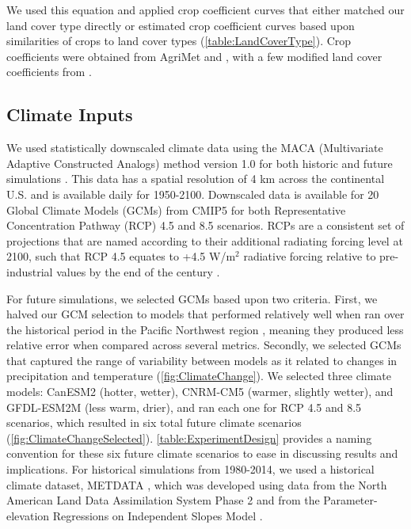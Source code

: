 \documentclass[water,article,submit,moreauthors,pdftex,10pt,a4paper]{mdpi}
\theoremstyle{mdpi}
\newcounter{re}
\theoremstyle{mdpidefinition}
\begin{document}
We used this equation and applied crop coefficient curves that either matched our land cover type directly or estimated crop coefficient curves based upon similarities of crops to land cover types (\cref{table:LandCoverType}). Crop coefficients were obtained from AgriMet and \citep{Allen:2007ta}, with a few modified land cover coefficients from \citep{Inouye:2014ws}.  

\subsection{Climate Inputs}

We used statistically downscaled climate data using the MACA (Multivariate Adaptive Constructed Analogs) method version 1.0 for both historic and future simulations \citep{Abatzoglou:2011kca}. This data has a spatial resolution of 4 km across the continental U.S. and is available daily for 1950-2100. Downscaled data is available for 20 Global Climate Models (GCMs) from CMIP5 for both Representative Concentration Pathway (RCP) 4.5 and 8.5 scenarios. RCPs are a consistent set of projections that are named according to their additional radiating forcing level at 2100, such that RCP 4.5 equates to +4.5 W/m${}^2$ radiative forcing relative to pre-industrial values by the end of the century \citep{vanVuuren:2011tu}. 

For future simulations, we selected GCMs based upon two criteria. First, we halved our GCM selection to models that performed relatively well when ran over the historical period in the Pacific Northwest region \citep{Rupp:2013ea}, meaning they produced less relative error when compared across several metrics. Secondly, we selected GCMs that captured the range of variability between models as it related to changes in precipitation and temperature (\cref{fig:ClimateChange}). We selected three climate models: CanESM2 (hotter, wetter), CNRM-CM5 (warmer, slightly wetter), and GFDL-ESM2M (less warm, drier), and ran each one for RCP 4.5 and 8.5 scenarios, which resulted in six total future climate scenarios (\cref{fig:ClimateChangeSelected}). \cref{table:ExperimentDesign} provides a naming convention for these six future climate scenarios to ease in discussing results and implications. For historical simulations from 1980-2014, we used a historical climate dataset, METDATA \citep{Abatzoglou:2011em}, which was developed using data from the North American Land Data Assimilation System Phase 2 \citep[NLDAS-2,][]{Mitchell:2004hf} and from the Parameter-elevation Regressions on Independent Slopes Model \citep[PRISM,][]{Daly:2008hsa}.  
\end{document}
